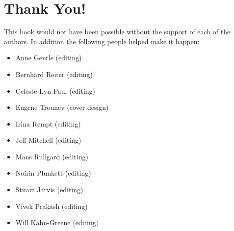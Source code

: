 \section*{Thank You!}

This book would not have been possible without the support of each of the
authors. In addition the following people helped make it happen:
\begin{itemize}
 \item Anne Gentle (editing)
 \item Bernhard Reiter (editing)
 \item Celeste Lyn Paul (editing)
 \item Eugene Trounev (cover design)
 \item Irina Rempt (editing)
 \item Jeff Mitchell (editing)
 \item Mans Rullgard (editing)
 \item Noirin Plunkett (editing)
 \item Stuart Jarvis (editing)
 \item Vivek Prakash (editing)
 \item Will Kahn-Greene (editing)
\end{itemize}

\newpage